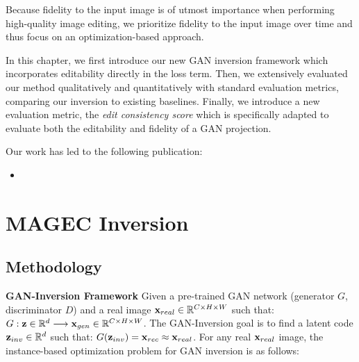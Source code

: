 Because fidelity to the input image is of utmost importance when performing 
high-quality image editing, we prioritize fidelity to the input image over time 
and thus focus on an optimization-based approach.


In this chapter, we first introduce our new \ac{GAN} inversion \magec framework 
which incorporates editability directly in the loss term. Then, we extensively evaluated 
our method qualitatively and 
quantitatively with standard evaluation metrics, comparing our \magec  inversion 
to existing baselines. Finally, we introduce a new 
evaluation metric, the \emph{edit consistency score} which is specifically adapted to 
evaluate both the editability and fidelity of a \ac{GAN} projection.

Our work has led to the following publication:
\begin{itemize}
  \item {}
\end{itemize}



\section{MAGEC Inversion}
\label{section:magec}



\subsection{Methodology}
 
\noindent \textbf{GAN-Inversion Framework} Given a pre-trained GAN network (generator $G$, 
discriminator $D$) and a real image $\mathbf{x}_{real} \in \mathbb{R}^{C\times H\times W}$ such that: $
    G : \mathbf{z} \in \mathbb{R}^{d} \longrightarrow \mathbf{x}_{gen} \in \mathbb{R}^{C\times H\times W}$.
     The GAN-Inversion goal is to find a latent code $\mathbf{z}_{inv} \in \mathbb{R}^{d}$ such that: 
     $G(\mathbf{z}_{inv}) = \mathbf{x}_{rec} \approx \mathbf{x}_{real}$.
 For any real $\mathbf{x}_{real}$ image, the instance-based optimization problem for GAN inversion is as follows:


